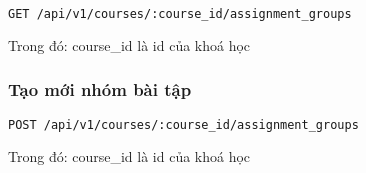 \documentclass[../Thesis.tex]{subfiles}
\begin{document}
            \begin{lstlisting}[language=bash]
              GET /api/v1/courses/:course_id/assignment_groups
            \end{lstlisting}

            Trong đó: course\_id là id của khoá học

          \subsubsection{Tạo mới nhóm bài tập}

            \begin{lstlisting}[language=bash]
              POST /api/v1/courses/:course_id/assignment_groups
            \end{lstlisting}

            Trong đó: course\_id là id của khoá học
\end{document}

